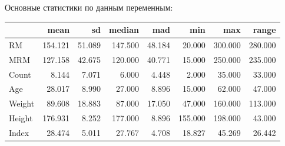 \documentclass[
]{article}
\newenvironment{Shaded}{\begin{snugshade}}{\end{snugshade}}
\newcommand{\CommentTok}[1]{\textcolor[rgb]{0.56,0.35,0.01}{\textit{#1}}}
\newcommand{\DataTypeTok}[1]{\textcolor[rgb]{0.13,0.29,0.53}{#1}}
\newcommand{\DecValTok}[1]{\textcolor[rgb]{0.00,0.00,0.81}{#1}}
\newcommand{\KeywordTok}[1]{\textcolor[rgb]{0.13,0.29,0.53}{\textbf{#1}}}
\newcommand{\NormalTok}[1]{#1}
\newcommand{\OperatorTok}[1]{\textcolor[rgb]{0.81,0.36,0.00}{\textbf{#1}}}
\newcommand{\StringTok}[1]{\textcolor[rgb]{0.31,0.60,0.02}{#1}}
\begin{document}
Основные статистики по данным переменным:

\begin{Shaded}
\end{Shaded}

\begin{longtable}[]{@{}lrrrrrrr@{}}
\toprule
& mean & sd & median & mad & min & max & range\tabularnewline
\midrule
\endhead
RM & 154.121 & 51.089 & 147.500 & 48.184 & 20.000 & 300.000 &
280.000\tabularnewline
MRM & 127.158 & 42.675 & 120.000 & 40.771 & 15.000 & 250.000 &
235.000\tabularnewline
Count & 8.144 & 7.071 & 6.000 & 4.448 & 2.000 & 35.000 &
33.000\tabularnewline
Age & 28.017 & 8.990 & 27.000 & 8.896 & 15.000 & 62.000 &
47.000\tabularnewline
Weight & 89.608 & 18.883 & 87.000 & 17.050 & 47.000 & 160.000 &
113.000\tabularnewline
Height & 176.931 & 8.252 & 177.000 & 8.896 & 155.000 & 198.000 &
43.000\tabularnewline
Index & 28.474 & 5.011 & 27.767 & 4.708 & 18.827 & 45.269 &
26.442\tabularnewline
\bottomrule
\end{longtable}

\begin{Shaded}
\end{Shaded}
\end{document}
